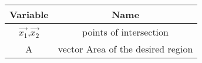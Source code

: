 \begin{tabular}[12pt]{ |c| c|}
    \hline
    \textbf{Variable} & \textbf{Name}\\ 
    \hline
	$\vec{x_1}$,$\vec{x_2}$ & points of intersection \\
    \hline
	A & vector Area of the desired region\\
    \hline
    \end{tabular}
